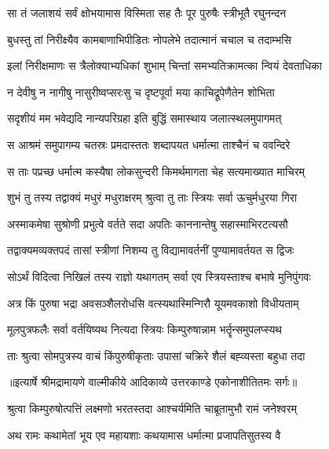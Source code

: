 \twolineshloka
{सा तं जलाशयं सर्वं क्षोभयामास विस्मिता}
{सह तैः पूर पुरुषैः स्त्रीभूतै रघुनन्दन} %

\twolineshloka
{बुधस्तु तां निरीक्ष्यैव कामबाणाभिपीडितः}
{नोपलेभे तदात्मानं चचाल च तदाम्भसि} %

\twolineshloka
{इलां निरीक्षमाणः स त्रैलोक्याभ्यधिकां शुभाम्}
{चिन्तां समभ्यतिक्रामत्का न्वियं देवताधिका} %

\twolineshloka
{न देवीषु न नागीषु नासुरीष्वप्सरःसु च}
{दृष्टपूर्वा मया काचिद्रूपेणैतेन शोभिता} %

\twolineshloka
{सदृशीयं मम भवेद्यदि नान्यपरिग्रहा}
{इति बुद्धिं समास्थाय जलात्स्थलमुपागमत्} %

\twolineshloka
{स आश्रमं समुपागम्य चतस्रः प्रमदास्ततः}
{शब्दापयत धर्मात्मा ताश्चैनं च ववन्दिरे} %

\twolineshloka
{स ताः पप्रच्छ धर्मात्म कस्यैषा लोकसुन्दरी}
{किमर्थमागता चेह सत्यमाख्यात माचिरम्} %

\twolineshloka
{शुभं तु तस्य तद्वाक्यं मधुरं मधुराक्षरम्}
{श्रुत्वा तु ताः स्त्रियः सर्वा ऊचुर्मधुरया गिरा} %

\twolineshloka
{अस्माकमेषा सुश्रोणी प्रभुत्वे वर्तते सदा}
{अपतिः काननान्तेषु सहास्माभिरटत्यसौ} %

\twolineshloka
{तद्वाक्यमव्यक्तपदं तासां स्त्रीणां निशम्य तु}
{विद्यामावर्तनीं पुण्यामावर्तयत स द्विजः} %

\twolineshloka
{सोऽर्थं विदित्वा निखिलं तस्य राज्ञो यथागतम्}
{सर्वा एव स्त्रियस्ताश्च बभाषे मुनिपुंगवः} %

\twolineshloka
{अत्र किं पुरुषा भद्रा अवसञ्शैलरोधसि}
{वत्स्यथास्मिन्गिरौ यूयमवकाशो विधीयताम्} %

\twolineshloka
{मूलपुत्रफलैः सर्वा वर्तयिष्यथ नित्यदा}
{स्त्रियः किम्पुरुषान्नाम भर्तॄन्समुपलप्स्यथ} %

\twolineshloka
{ताः श्रुत्वा सोमपुत्रस्य वाचं किंपुरुषीकृताः}
{उपासां चक्रिरे शैलं बह्व्यस्ता बहुधा तदा} %


{॥इत्यार्षे श्रीमद्रामायणे वाल्मीकीये आदिकाव्ये उत्तरकाण्डे एकोनाशीतितमः सर्गः॥}


\twolineshloka
{श्रुत्वा किम्पुरुषोत्पत्तिं लक्ष्मणो भरतस्तदा}
{आश्चर्यमिति चाब्रूतामुभौ रामं जनेश्वरम्} %

\twolineshloka
{अथ रामः कथामेतां भूय एव महायशाः}
{कथयामास धर्मात्मा प्रजापतिसुतस्य वै} %

